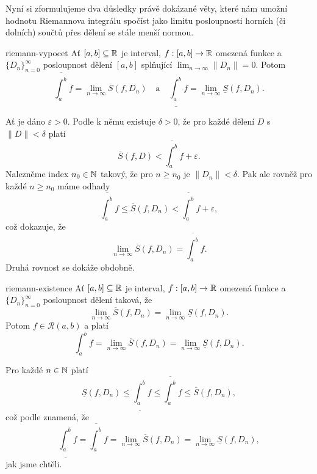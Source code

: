 Nyní si zformulujeme dva důsledky právě dokázané věty, které nám umožní hodnotu
Riemannova integrálu spočíst jako limitu posloupnosti horních (či dolních)
součtů přes dělení se stále menší normou.

\begin{corollary}{}{riemann-vypocet}
 Ať $[a,b] \subseteq \mathbb{R}$ je interval, $f:[a,b] \to \mathbb{R}$ omezená funkce a
 $\{D_n\}_{n=0}^{\infty}$ posloupnost dělení $[a,b]$ splňující $\lim_{n \to
 \infty} \|D_n\| = 0$. Potom
 \[
  \overline{\int_{a}^{b}} f = \lim_{n \to \infty} \overline{S}(f,D_n) \quad
  \text{a} \quad \underline{\int_{a}^{b}} f = \lim_{n \to \infty}
  \underline{S}(f,D_n).
 \]
\end{corollary}
\begin{corproof}
 Ať je dáno $\varepsilon>0$. Podle
  k němu existuje $\delta>0$,
 že pro každé dělení $D$ s~$\|D\|<\delta$ platí
 \[
  \overline{S}(f,D) < \overline{\int_{a}^{b}} f + \varepsilon.
 \]
 Nalezněme index $n_0 \in \mathbb{N}$ takový, že pro $n \geq n_0$ je $\|D_n\| < \delta$.
 Pak ale rovněž pro každé $n \geq n_0$ máme odhady
 \[
  \overline{\int_{a}^{b}} f \leq \overline{S}(f,D_n) < \overline{\int_{a}^{b}} f
  + \varepsilon,
 \]
 což dokazuje, že
 \[
  \lim_{n \to \infty} \overline{S}(f,D_n) = \overline{\int_{a}^{b}} f.
 \]
 Druhá rovnost se dokáže obdobně.
\end{corproof}

\begin{corollary}{}{riemann-existence}
 Ať $[a,b] \subseteq \mathbb{R}$ je interval, $f:[a,b] \to \mathbb{R}$ omezená funkce a
 $\{D_n\}_{n=0}^{\infty}$ posloupnost dělení taková, že
 \[
  \lim_{n \to \infty} \overline{S}(f,D_n) = \lim_{n \to \infty}
  \underline{S}(f,D_n).
 \]
 Potom $f \in \mathcal{R}(a,b)$ a platí
 \[
  \int_{a}^{b} f = \lim_{n \to \infty} \overline{S}(f,D_n) = \lim_{n \to \infty}
  \underline{S}(f,D_n).
 \]
\end{corollary}
\begin{corproof}
 Pro každé $n \in \mathbb{N}$ platí
 \[
  \underline{S}(f,D_n) \leq \underline{\int_{a}^{b}} f \leq
  \overline{\int_{a}^{b}} f \leq \overline{S}(f,D_n),
 \]
 což podle  znamená, že
 \[
  \underline{\int_{a}^{b}} f = \overline{\int_{a}^{b}} f = \lim_{n \to \infty}
  \overline{S}(f,D_n) = \lim_{n \to \infty} \underline{S}(f,D_n),
 \]
 jak jsme chtěli.
\end{corproof}

